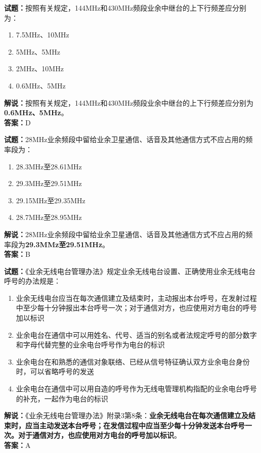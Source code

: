 \documentclass{ctexbook}
\begin{document}
\bigskip




\noindent\textbf{试题：}按照有关规定，144\unit{\MHz}和430\unit{\MHz}频段业余中继台的上下行频差应分别为：
\begin{enumerate}[leftmargin=3em]
\item 7.5\unit{\MHz}、10\unit{\MHz}
\item 5\unit{\MHz}、5\unit{\MHz}
\item 2\unit{\MHz}、10\unit{\MHz}
\item 0.6\unit{\MHz}、5\unit{\MHz}%
\end{enumerate}
\noindent\textbf{解说：}按照有关规定，144\unit{\MHz}和430\unit{\MHz}频段业余中继台的上下行频差应分别为\textbf{0.6\unit{\MHz}、5\unit{\MHz}}。\\\noindent\textbf{答案：}D

\bigskip




\noindent\textbf{试题：}28\unit{\MHz}业余频段中留给业余卫星通信、话音及其他通信方式不应占用的频率段为：
\begin{enumerate}[leftmargin=3em]
\item 28.3\unit{\MHz}至28.61\unit{\MHz}
\item 29.3\unit{\MHz}至29.51\unit{\MHz} %
\item 29.15\unit{\MHz}至29.35\unit{\MHz}
\item 28.7\unit{\MHz}至28.95\unit{\MHz}
\end{enumerate}
\noindent\textbf{解说：}28\unit{\MHz}业余频段中留给业余卫星通信、话音及其他通信方式不应占用的频率段为\textbf{29.3MMz至29.51\unit{\MHz}}。\\\noindent\textbf{答案：}B

\bigskip




\noindent\textbf{试题：}《业余无线电台管理办法》规定业余无线电台设置、正确使用业余无线电台呼号的办法规是：
\begin{enumerate}[leftmargin=3em]
\item 业余无线电台应当在每次通信建立及结束时，主动报出本台呼号，在发射过程中至少每十分钟报出本台呼号一次；对于通信对方，也应使用对方电台的呼号加以标识
\item 业余电台在通信中可以用姓名、代号、适当的别名或者法规定呼号的部分数字和字母代替完整的业余电台呼号作为电台的标识
\item 业余电台在和熟悉的通信对象联络、已经从信号特征确认双方业余电台身份时，可以省略呼号的发送
\item 业余电台在通信中可以用自造的呼号作为无线电管理机构指配的业余电台呼号的补充，一起作为电台的标识
\end{enumerate}
\noindent\textbf{解说：}《业余无线电台管理办法》附录3第8条：\textbf{业余无线电台在每次通信建立及结束时，应当主动发送本台呼号；在发信过程中应当至少每十分钟发送本台呼号一次。对于通信对方，也应使用对方电台的呼号加以标识}。\\\noindent\textbf{答案：}A
\end{document}
